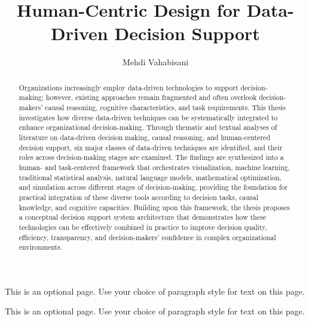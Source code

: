 \documentclass{sfuthesis}
\title{Human-Centric Design for Data-Driven Decision Support}
\author{Mehdi Vahabisani}
\begin{document}
\frontmatter
\maketitle{}
\makecommittee{}


\begin{abstract}
Organizations increasingly employ data-driven technologies to support decision-making; however, existing approaches remain fragmented and often overlook decision-makers’ causal reasoning, cognitive characteristics, and task requirements. This thesis investigates how diverse data-driven techniques can be systematically integrated to enhance organizational decision-making. Through thematic and textual analyses of literature on data-driven decision making, causal reasoning, and human-centered decision support, six major classes of data-driven techniques are identified, and their roles across decision-making stages are examined. The findings are synthesized into a human- and task-centered framework that orchestrates visualization, machine learning, traditional statistical analysis, natural language models, mathematical optimization, and simulation across different stages of decision-making, providing the foundation for practical integration of these diverse tools according to decision tasks, causal knowledge, and cognitive capacities. Building upon this framework, the thesis proposes a conceptual decision support system architecture that demonstrates how these technologies can be effectively combined in practice to improve decision quality, efficiency, transparency, and decision-makers’ confidence in complex organizational environments.
\end{abstract}


\begin{dedication}
This is an optional page. Use your choice of paragraph style for text on this page.
\end{dedication}


\begin{acknowledgements}
This is an optional page. Use your choice of paragraph style for text on this page.
\end{acknowledgements}

%
\tableofcontents%
\clearpage

%
\listoftables%
\clearpage
\end{document}
